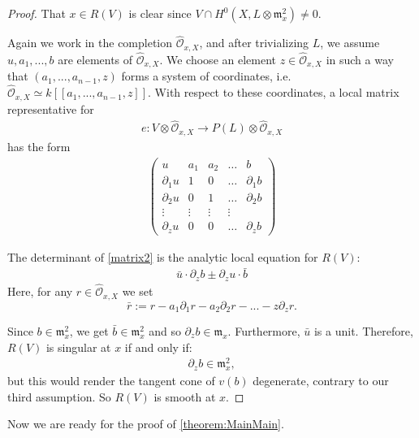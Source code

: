 \documentclass[11pt,reqno]{amsart}
\theoremstyle{plain}
\theoremstyle{definition}
\theoremstyle{remark}
\numberwithin{equation}{section}
\newcommand{\cO}{{\mathcal O}}
\renewcommand{\to}{{\longrightarrow}}
\numberwithin{equation}{section}
\begin{document}
\begin{proof}
  That $x \in R(V)$ is clear since $V \cap H^{0}(X,L \otimes \mathfrak{m}^{2}_{x}) \neq 0 $.

  Again we work in the completion $\widehat{\cO}_{x,X}$, and after trivializing $L$, we assume $u, a_{1}, ..., b$ are elements of $\widehat{\cO}_{x,X}$. We choose an element $z \in \widehat{\cO}_{x,X}$ in such a way that $(a_{1}, ..., a_{n-1}, z)$ forms a system of coordinates, i.e. $\widehat{\cO}_{x,X} \simeq k[[a_{1}, ..., a_{n-1}, z ]]$.  With respect to these coordinates, a local matrix representative for \begin{align*}
  e: V \otimes \widehat{\cO}_{x,X} \to P(L) \otimes \widehat{\cO}_{x,X}
\end{align*}
has the form
\begin{align}\label{matrix2}
\begin{pmatrix}
  u & a_{1} & a_{2} & \dots & b \\
  \partial_{1}u & 1 & 0 & \dots & \partial_{1}b \\
  \partial_{2}u & 0 & 1 & \dots & \partial_{2}b \\
  \vdots & \vdots & \vdots & \vdots \\
  \partial_{z}u  & 0 & 0 & \dots & \partial_{z}b
\end{pmatrix}
\end{align}

The determinant of \ref{matrix2} is the analytic local equation for $R(V)$: 
\begin{align*}
   \bar{u} \cdot \partial_{z}b \pm \partial_{z}u \cdot \bar{b}
 \end{align*} 
 Here, for any $r \in \widehat{\cO}_{x,X}$ we set $$\bar{r} := r - a_{1}\partial_{1}r - a_{2}\partial_{2}r - ... - z \partial_{z} r.$$

 Since $b \in {\mathfrak m}^{2}_{x}$, we get $\bar{b} \in {\mathfrak m}^{2}_{x}$ and so $\partial_{z}b \in {\mathfrak m}_{x}$.  Furthermore, $\bar{u}$ is a unit.  Therefore,  $R(V)$ is singular at $x$ if and only if: 
 \begin{align*}
  \partial_{z}b \in {\mathfrak m}^{2}_{x},
 \end{align*}
 but this would render the tangent cone of $v(b)$ degenerate, contrary to our third assumption. So $R(V)$ is smooth at $x$.
\end{proof}

Now we are ready for the proof of \autoref{theorem:MainMain}. 
\end{document}
